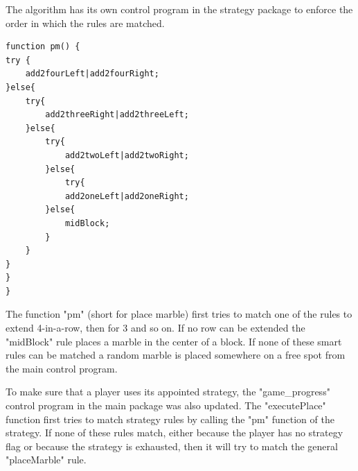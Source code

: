The algorithm  has its own control program in the strategy package to enforce the order in which the rules are matched.

\begin{lstlisting}
function pm() {
try {
	add2fourLeft|add2fourRight;
}else{
	try{
		add2threeRight|add2threeLeft;
	}else{
		try{
			add2twoLeft|add2twoRight;
		}else{
			try{
			add2oneLeft|add2oneRight;
		}else{
			midBlock;
		}
	}
}
}
}
\end{lstlisting}
The function "pm" (short for place marble) first tries to match one of the rules to extend 4-in-a-row, then for 3 and so on. If no row can be extended the "midBlock" rule  places a marble in the center of a block. If none of these smart rules can be matched a random marble is placed somewhere on a free spot from the main control program.

\vspace{6pt}

To make sure that a player uses its appointed strategy, the "game\_progress" control program in the main package was also updated.
The "executePlace" function first tries to match strategy rules by calling the "pm" function of the strategy. If none of these rules match, either because the player has no strategy flag or because the strategy is exhausted, then it will try to match the general "placeMarble" rule. 

